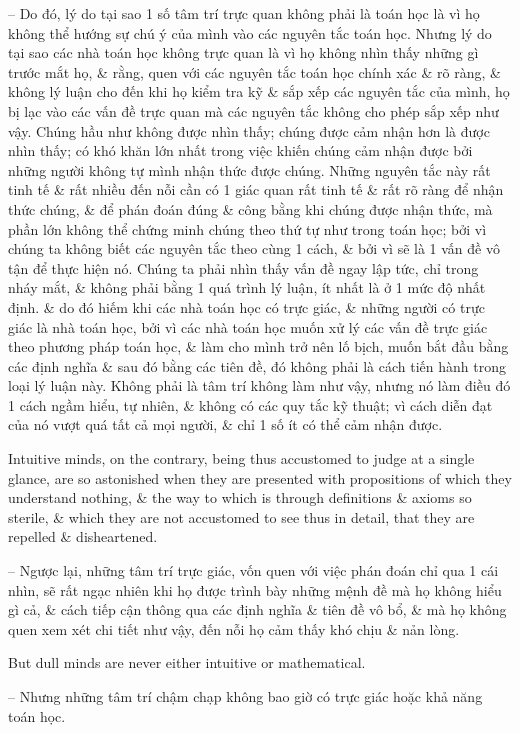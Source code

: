 \documentclass{article}
\begin{document}
\begin{enumerate}
\begin{itemize}
		-- Do đó, lý do tại sao 1 số tâm trí trực quan không phải là toán học là vì họ không thể hướng sự chú ý của mình vào các nguyên tắc toán học. Nhưng lý do tại sao các nhà toán học không trực quan là vì họ không nhìn thấy những gì trước mắt họ, \& rằng, quen với các nguyên tắc toán học chính xác \& rõ ràng, \& không lý luận cho đến khi họ kiểm tra kỹ \& sắp xếp các nguyên tắc của mình, họ bị lạc vào các vấn đề trực quan mà các nguyên tắc không cho phép sắp xếp như vậy. Chúng hầu như không được nhìn thấy; chúng được cảm nhận hơn là được nhìn thấy; có khó khăn lớn nhất trong việc khiến chúng cảm nhận được bởi những người không tự mình nhận thức được chúng. Những nguyên tắc này rất tinh tế \& rất nhiều đến nỗi cần có 1 giác quan rất tinh tế \& rất rõ ràng để nhận thức chúng, \& để phán đoán đúng \& công bằng khi chúng được nhận thức, mà phần lớn không thể chứng minh chúng theo thứ tự như trong toán học; bởi vì chúng ta không biết các nguyên tắc theo cùng 1 cách, \& bởi vì sẽ là 1 vấn đề vô tận để thực hiện nó. Chúng ta phải nhìn thấy vấn đề ngay lập tức, chỉ trong nháy mắt, \& không phải bằng 1 quá trình lý luận, ít nhất là ở 1 mức độ nhất định. \& do đó hiếm khi các nhà toán học có trực giác, \& những người có trực giác là nhà toán học, bởi vì các nhà toán học muốn xử lý các vấn đề trực giác theo phương pháp toán học, \& làm cho mình trở nên lố bịch, muốn bắt đầu bằng các định nghĩa \& sau đó bằng các tiên đề, đó không phải là cách tiến hành trong loại lý luận này. Không phải là tâm trí không làm như vậy, nhưng nó làm điều đó 1 cách ngầm hiểu, tự nhiên, \& không có các quy tắc kỹ thuật; vì cách diễn đạt của nó vượt quá tất cả mọi người, \& chỉ 1 số ít có thể cảm nhận được.
		
		Intuitive minds, on the contrary, being thus accustomed to judge at a single glance, are so astonished when they are presented with propositions of which they understand nothing, \& the way to which is through definitions \& axioms so sterile, \& which they are not accustomed to see thus in detail, that they are repelled \& disheartened.
		
		-- Ngược lại, những tâm trí trực giác, vốn quen với việc phán đoán chỉ qua 1 cái nhìn, sẽ rất ngạc nhiên khi họ được trình bày những mệnh đề mà họ không hiểu gì cả, \& cách tiếp cận thông qua các định nghĩa \& tiên đề vô bổ, \& mà họ không quen xem xét chi tiết như vậy, đến nỗi họ cảm thấy khó chịu \& nản lòng.
		
		But dull minds are never either intuitive or mathematical.
		
		-- Nhưng những tâm trí chậm chạp không bao giờ có trực giác hoặc khả năng toán học.
		

\end{itemize}
\end{enumerate}
\end{document}
